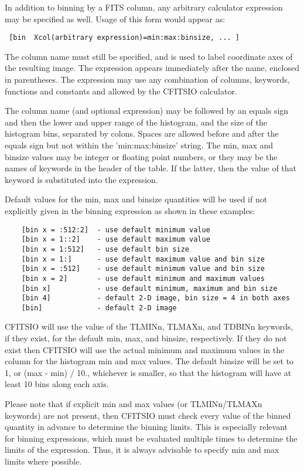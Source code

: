 \documentclass[11pt]{book}
\begin{document}
In addition to binning by a FITS column, any arbitrary calculator
expression may be specified as well.  Usage of this form would appear
as:

\begin{verbatim}
 [bin  Xcol(arbitrary expression)=min:max:binsize, ... ]
\end{verbatim}

The column name must still be specified, and is used to label
coordinate axes of the resulting image.  The expression appears
immediately after the name, enclosed in parentheses.  The expression
may use any combination of columns, keywords, functions and constants
and allowed by the CFITSIO calculator.

The column name (and optional expression) may be followed by an equals
sign and then the lower and upper range of the histogram, and the size
of the histogram bins, separated by colons.  Spaces are allowed before
and after the equals sign but not within the 'min:max:binsize' string.
The min, max and binsize values may be integer or floating point
numbers, or they may be the names of keywords in the header of the
table.  If the latter, then the value of that keyword is substituted
into the expression.

Default values for the min, max and binsize quantities will be
used if not explicitly given in the binning expression as shown
in these examples:

\begin{verbatim}
    [bin x = :512:2]  - use default minimum value
    [bin x = 1::2]    - use default maximum value
    [bin x = 1:512]   - use default bin size
    [bin x = 1:]      - use default maximum value and bin size
    [bin x = :512]    - use default minimum value and bin size
    [bin x = 2]       - use default minimum and maximum values
    [bin x]           - use default minimum, maximum and bin size
    [bin 4]           - default 2-D image, bin size = 4 in both axes
    [bin]             - default 2-D image
\end{verbatim}
CFITSIO  will use the value of the TLMINn, TLMAXn, and TDBINn keywords,
if they exist, for the default min, max, and binsize, respectively.  If
they do not exist then CFITSIO will use the actual minimum and maximum
values in the column for the histogram min and max values.  The default
binsize will be set to 1, or (max - min) / 10., whichever is smaller,
so that the histogram will have at least 10 bins along each axis.

Please note that if explicit min and max values (or TLMINn/TLMAXn keywords)
are not present, then CFITSIO must check every value of the binned quantity
in advance to determine the binning limits.  This is especially relevant 
for binning expressions, which must be evaluated multiple times to determine
the limits of the expression.  Thus, it is always advisable to specify 
min and max limits where possible.
\end{document}

